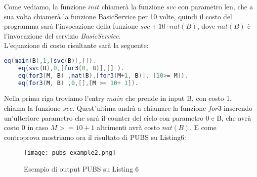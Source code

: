 \documentclass[../../main.tex]{subfiles}
\begin{document}
Come vediamo, la funzione $init$ chiamerà la funzione $svc$ con parametro len, che a sua volta chiamerà la funzione BasicService per 10 volte, quindi il costo del programma sarà l'invocazione della funzione $svc + 10 \cdot nat(B)$, dove $nat(B)$ è l'invocazione del servizio \textit{BasicService}.\\
L'equazione di costo risultante sarà la seguente:
\begin{lstlisting}[language=Java,caption={Equazione di costo PUBS per Listing6}]
    eq(main(B),1,[svc(B)],[]).
    eq(svc(B),0,[for3(0, B)],[] ).
    eq(for3(M, B) ,nat(B),[for3(M+1, B)], [10>= M]).
    eq(for3(M, B) ,0,[],[M >= 10+ 1]).
\end{lstlisting}

Nella prima riga troviamo l'entry $main$ che prende in input B, con costo 1, chiama la funzione $svc$.
Quest'ultima andrà a chiamare la funzione $for3$ inserendo un'ulteriore parametro che sarà il counter del ciclo con parametro 0 e B, che avrà costo 0 in caso $M >= 10 + 1$ altrimenti avrà costo $nat(B)$.
E come controprova mostriamo ora il risultato di PUBS su Listing6:
\begin{figure}[H]
    \centering
    \texttt{[image: pubs\_example2.png]}
    \caption{Esempio di output PUBS su Listing 6}
\end{figure}
\end{document}
